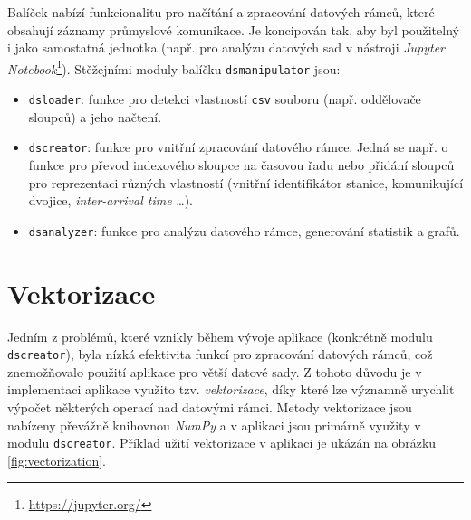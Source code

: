 Balíček nabízí funkcionalitu pro načítání a zpracování datových rámců, které obsahují záznamy průmyslové komunikace. Je koncipován tak, aby byl použitelný i jako samostatná jednotka (např. pro  analýzu datových sad v nástroji \emph{Jupyter Notebook}\footnote{\url{https://jupyter.org/}}). Stěžejními moduly balíčku \texttt{dsmanipulator} jsou:

\begin{itemize}
    \item \texttt{dsloader}: funkce pro detekci vlastností \texttt{csv} souboru (např. oddělovače sloupců) a jeho načtení.
    \item \texttt{dscreator}: funkce pro vnitřní zpracování datového rámce. Jedná se např. o funkce pro převod indexového sloupce na časovou řadu nebo přidání sloupců pro reprezentaci různých vlastností (vnitřní identifikátor stanice, komunikující dvojice, \emph{inter-arrival time} \dots).
    \item \texttt{dsanalyzer}: funkce pro analýzu datového rámce, generování statistik a grafů.
\end{itemize}






\section{Vektorizace}
\label{vectorization}

Jedním z problémů, které vznikly během vývoje aplikace (konkrétně modulu \texttt{dscreator}), byla nízká efektivita funkcí pro zpracování datových rámců, což znemožňovalo použití aplikace pro větší datové sady. Z tohoto důvodu je v implementaci aplikace využito tzv. \emph{vektorizace}, díky které lze významně urychlit výpočet některých operací nad datovými rámci. Metody vektorizace jsou nabízeny převážně knihovnou \emph{NumPy} a v aplikaci jsou primárně využity v modulu \texttt{dscreator}. Příklad užití vektorizace v aplikaci je ukázán na obrázku \ref{fig:vectorization}.

